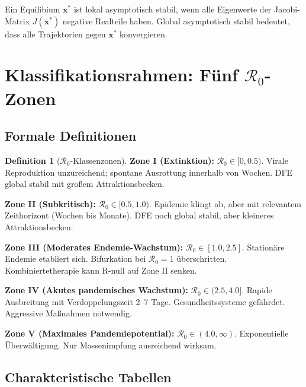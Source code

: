 ﻿\documentclass[a4paper,12pt,twoside]{article}
\theoremstyle{definition}
\newtheorem{definition}{Definition}[section]
\begin{document}
Ein Equilibium $\mathbf{x}^*$ ist lokal asymptotisch stabil, wenn alle Eigenwerte der Jacobi-Matrix $J(\mathbf{x}^*)$ negative Realteile haben. Global asymptotisch stabil bedeutet, dass alle Trajektorien gegen $\mathbf{x}^*$ konvergieren.

\section{Klassifikationsrahmen: Fünf $\mathcal{R}_0$-Zonen}
\label{sec:classification}

\subsection{Formale Definitionen}

\begin{definition}[$\mathcal{R}_0$-Klassenzonen]

\textbf{Zone I (Extinktion):} $\mathcal{R}_0 \in [0, 0.5)$. Virale Reproduktion unzureichend; spontane Ausrottung innerhalb von Wochen. DFE global stabil mit großem Attraktionsbecken.

\textbf{Zone II (Subkritisch):} $\mathcal{R}_0 \in [0.5, 1.0)$. Epidemie klingt ab, aber mit relevantem Zeithorizont (Wochen bis Monate). DFE noch global stabil, aber kleineres Attraktionsbecken.

\textbf{Zone III (Moderates Endemie-Wachstum):} $\mathcal{R}_0 \in [1.0, 2.5]$. Stationäre Endemie etabliert sich. Bifurkation bei $\mathcal{R}_0 = 1$ überschritten. Kombiniertetherapie kann R-null auf Zone II senken.

\textbf{Zone IV (Akutes pandemisches Wachstum):} $\mathcal{R}_0 \in (2.5, 4.0]$. Rapide Ausbreitung mit Verdoppelungszeit 2--7 Tage. Gesundheitssysteme gefährdet. Aggressive Maßnahmen notwendig.

\textbf{Zone V (Maximales Pandemiepotential):} $\mathcal{R}_0 \in (4.0, \infty)$. Exponentielle Überwältigung. Nur Massenimpfung ausreichend wirksam.

\end{definition}

\subsection{Charakteristische Tabellen}
\end{document}
